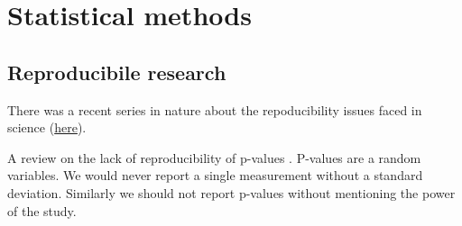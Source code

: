 \section{Statistical methods}

\subsection{Reproducibile research}

    There was a recent series in nature about the repoducibility issues faced
    in science
    (\href{http://www.nature.com/news/reproducibility-1.17552}{here}).

    A review on the lack of reproducibility of p-values
    \cite{halsey_fickle_2015}. P-values are a random variables. We would never
    report a single measurement without a standard deviation. Similarly we
    should not report p-values without mentioning the power of the study.
